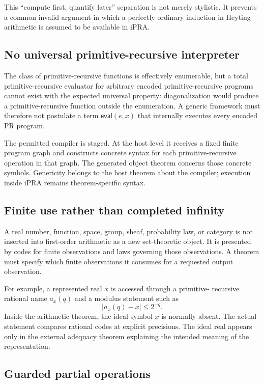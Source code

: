 This ``compute first, quantify later'' separation is not merely stylistic.  It
prevents a common invalid argument in which a perfectly ordinary induction in
Heyting arithmetic is assumed to be available in iPRA.

\subsection{No universal primitive-recursive interpreter}

The class of primitive-recursive functions is effectively enumerable, but a
total primitive-recursive evaluator for arbitrary encoded primitive-recursive
programs cannot exist with the expected universal property: diagonalization
would produce a primitive-recursive function outside the enumeration.  A
generic framework must therefore not postulate a term
\(\mathsf{eval}(e,x)\) that internally executes every encoded PR program.

The permitted compiler is staged.  At the host level it receives a fixed finite
program graph and constructs concrete syntax for each primitive-recursive
operation in that graph.  The generated object theorem concerns those concrete
symbols.  Genericity belongs to the host theorem about the compiler; execution
inside iPRA remains theorem-specific syntax.

\subsection{Finite use rather than completed infinity}

A real number, function, space, group, sheaf, probability law, or category is
not inserted into first-order arithmetic as a new set-theoretic object.  It is
presented by codes for finite observations and laws governing those
observations.  A theorem must specify which finite observations it consumes for
a requested output observation.

For example, a represented real \(x\) is accessed through a primitive-
recursive rational name \(a_x(q)\) and a modulus statement such as
\[
       |a_x(q)-x|\le 2^{-q}.
\]
Inside the arithmetic theorem, the ideal symbol \(x\) is normally absent.  The
actual statement compares rational codes at explicit precisions.  The ideal
real appears only in the external adequacy theorem explaining the intended
meaning of the representation.

\subsection{Guarded partial operations}

